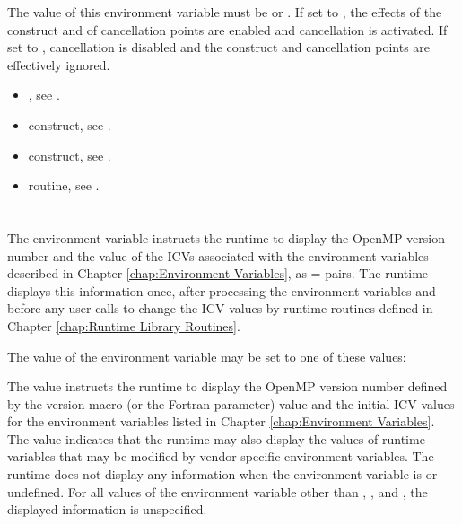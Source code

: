 The value of this environment variable must be  or . If set to , the 
effects of the  construct and of cancellation points are enabled and cancellation 
is activated. If set to , cancellation is disabled and the  construct and 
cancellation points are effectively ignored.

\crossreferences
\begin{itemize}
\item {}, see .

\item {} construct, see . 

\item {} construct, see .

\item {} routine, see .
\end{itemize}









\section{}
\label{sec:OMP_DISPLAY_ENV}
The  environment variable instructs the runtime to display the 
OpenMP version number and the value of the ICVs associated with the environment 
variables described in Chapter \ref{chap:Environment Variables}, 
as  =  pairs. The runtime displays this 
information once, after processing the environment variables and before any user calls 
to change the ICV values by runtime routines defined in Chapter \ref{chap:Runtime Library Routines}.

The value of the  environment variable may be set to one of these 
values:


The  value instructs the runtime to display the OpenMP version number defined by 
the  version macro (or the  Fortran parameter) value and 
the initial ICV values for the environment variables listed in 
Chapter \ref{chap:Environment Variables}. The  
value indicates that the runtime may also display the values 
of runtime variables that may be modified by vendor-specific 
environment variables. The runtime does not display any information 
when the  environment variable is 
 or undefined. For all values of the environment
variable other than , , and , 
the displayed information is unspecified.

